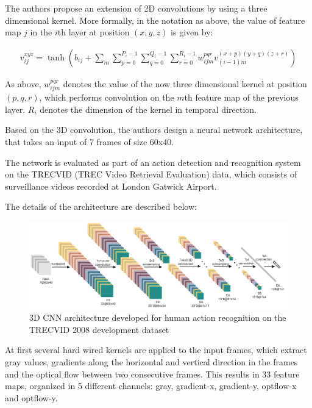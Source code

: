 The authors propose an extension of 2D convolutions by using a three dimensional kernel. More formally, in the notation as above, the value of feature map $j$ in the $i$th layer at position $(x,y,z)$ is given by:

\begin{align*}
    v_{ij}^{xyz} = \tanh \left( b_{ij} + \sum_m \sum_{p=0}^{P_i -1} \sum_{q = 0}^{Q_i - 1} \sum_{r = 0}^{R_i - 1} w_{ijm}^{pqr} v_{(i-1)m}^{(x+p)(y+q)(z+r)} \right)
\end{align*}

As above, $w_{ijm}^{pqr}$ denotes the value of the now three dimensional kernel at position $(p,q,r)$, which performs convolution on the $m$th feature map of the previous layer.
$R_i$ denotes the dimension of the kernel in temporal direction. 

Based on the 3D convolution, the authors design a neural network architecture, that takes an input of 7 frames of size 60x40.

The network is evaluated as part of an action detection and recognition system on the TRECVID (TREC Video Retrieval Evaluation) data, which consists of surveillance videos recorded at London Gatwick Airport.

The details of the architecture are described below:

\begin{figure}[H]
    \centering
    \includegraphics[width=\textwidth]{img_deep/3dconv_architecture}
    \caption{3D CNN architecture developed for human action recognition on the TRECVID 2008 development dataset \cite{ji_3d_2013}}
    \label{fig:3dconv_architecture}
\end{figure}

At first several hard wired kernels are applied to the input frames, which extract gray values, gradients along the horizontal and vertical direction in the frames and the optical flow between two consecutive frames. This results in 33 feature maps, organized in 5 different channels: gray, gradient-x, gradient-y, optflow-x and optflow-y.

